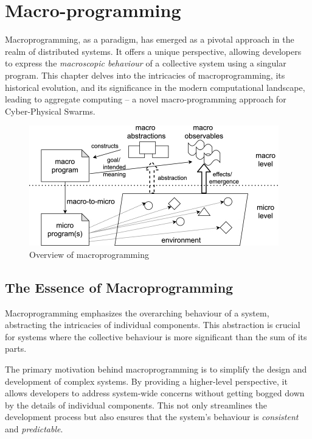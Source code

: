
\chapter{Macro-programming}\label{chap:macro-programming}
\minitoc%
Macroprogramming, as a paradigm, 
 has emerged as a pivotal approach in the realm of distributed systems. 
%
It offers a unique perspective, 
 allowing developers to express the \emph{macroscopic behaviour} of a collective system using a singular program.
% 
This chapter delves into the intricacies of macroprogramming, 
 its historical evolution, and its significance in the modern computational landscape, 
 leading to aggregate computing -- a novel macro-programming approach for Cyber-Physical Swarms.

\begin{figure}
\includegraphics[width=\textwidth]{chapters/img/macro-programming.jpg}
\caption{Overview of macroprogramming}\label{macro:fig:macro-programming}
\end{figure}
\section{The Essence of Macroprogramming}
Macroprogramming  emphasizes the overarching behaviour of a system, abstracting the intricacies of individual components. 
 This abstraction is crucial for systems where the collective behaviour is more significant than the sum of its parts.

The primary motivation behind macroprogramming 
 is to simplify the design and development of complex systems. 
 By providing a higher-level perspective, 
 it allows developers to address system-wide concerns without getting bogged down by the details of individual components. 
 This not only streamlines the development process but also ensures that the system's behaviour is \emph{consistent} and \emph{predictable}.

